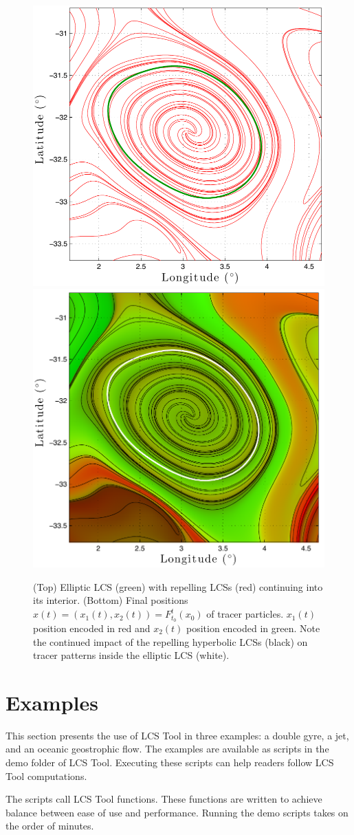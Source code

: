 \documentclass[5p]{elsarticle}
\begin{document}
\begin{figure}
\centering
\includegraphics[width=.475\textwidth]{graphics/ocean_dataset/LCS_fwd_coherent_eddy}
\includegraphics[width=.475\textwidth]{graphics/ocean_dataset/LCS_fwd_colortracer}
\caption{(Top) Elliptic LCS (green) with repelling LCSs (red) continuing into its interior. (Bottom) Final positions $x(t) = (x_1(t),x_2(t)) = F_{t_0}^t(x_0)$ of tracer particles. $x_1(t)$ position encoded in red and $x_2(t)$ position encoded in green. Note the continued impact of the repelling hyperbolic LCSs (black) on tracer patterns inside the elliptic LCS (white).}
\label{f:ocean_dataset_colortracer}
\end{figure}

\section{Examples}

This section presents the use of LCS Tool in three examples: a double gyre, a jet, and an oceanic geostrophic flow. The examples are available as scripts in the demo folder of LCS Tool. Executing these scripts can help readers follow LCS Tool computations.

The scripts call LCS Tool functions.
These functions are written to achieve balance between ease of use and performance.
Running the demo scripts takes on the order of minutes.
\end{document}

